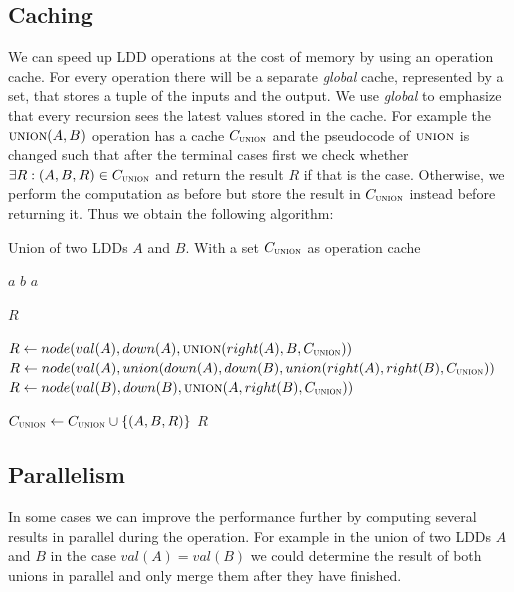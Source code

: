 \documentclass{article}
\newcommand{\var}[1]{\ensuremath{\textit{#1}}}
\begin{document}
\subsection{Caching}

We can speed up LDD operations at the cost of memory by using an operation cache.
For every operation there will be a separate \emph{global} cache, represented by a set, that stores a tuple of the inputs and the output.
We use \emph{global} to emphasize that every recursion sees the latest values stored in the cache.  
For example the $\textsc{union}(A, B)$ operation has a cache $C_\textsc{union}$ and the pseudocode of $\textsc{union}$ is changed such that after the terminal cases first we check whether $\exists R : (A, B, R) \in C_\textsc{union}$ and return the result $R$ if that is the case.
Otherwise, we perform the computation as before but store the result in $C_\textsc{union}$ instead before returning it.
Thus we obtain the following algorithm:

\begin{algorithm}[H]
\caption{Union of two LDDs $\var{A}$ and $\var{B}$.
	With a set $C_\textsc{union}$ as operation cache}
\begin{algorithmic}[1]
	\State \Return $a$
	\State \Return $b$
	\State \Return $a$
\EndIf

	\Return $R$
\EndIf

	\State $R \gets node(val(A), down(A), \textsc{union}(right(A), B, C_\textsc{union}))$
	\State $R \gets node(val(A), union(down(A), down(B), union(right(A), right(B), C_\textsc{union}))$
	\State $R \gets node(val(B), down(B), \textsc{union}(A, right(B), C_\textsc{union}))$
\EndIf

\State $C_\textsc{union} \gets C_\textsc{union} \cup \{(A, B, R)\}$
\State \Return $R$
\EndFunction
\end{algorithmic}
\end{algorithm}

\subsection{Parallelism}

In some cases we can improve the performance further by computing several results in parallel during the operation.
For example in the union of two LDDs $A$ and $B$ in the case $val(A) = val(B)$ we could determine the result of both unions in parallel and only merge them after they have finished.



\end{document}
